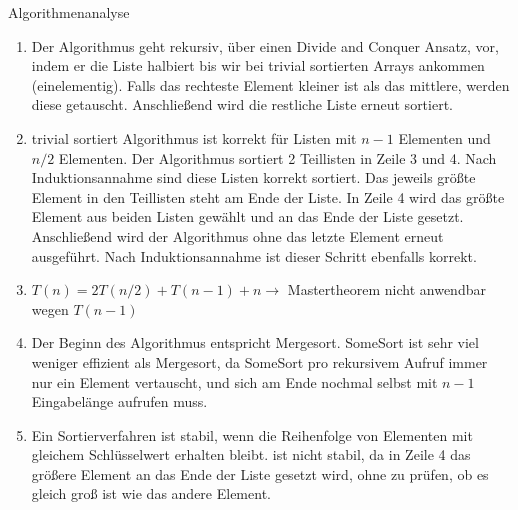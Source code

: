 \documentclass{article}
\begin{document}
\begin{exercise}{Algorithmenanalyse}
  \begin{solution}
    \begin{enumerate}
      \item Der Algorithmus geht rekursiv, über einen Divide and Conquer Ansatz, vor, indem er die Liste halbiert bis wir bei trivial sortierten Arrays ankommen (einelementig). Falls das rechteste Element kleiner ist als das mittlere, werden diese getauscht. Anschließend wird die restliche Liste erneut sortiert.
      \item \begin{induction}[|L|]
              \base[1] trivial sortiert
              \cond Algorithmus ist korrekt für Listen mit $n-1$ Elementen und $n/2$ Elementen.
              \step Der Algorithmus sortiert 2 Teillisten in Zeile 3 und 4. Nach Induktionsannahme sind diese Listen korrekt sortiert. Das jeweils größte Element in den Teillisten steht am Ende der Liste. In Zeile 4 wird das größte Element aus beiden Listen gewählt und an das Ende der Liste gesetzt. Anschließend wird der Algorithmus ohne das letzte Element erneut ausgeführt. Nach Induktionsannahme ist dieser Schritt ebenfalls korrekt.
            \end{induction}
      \item $T(n) = 2T(n/2) + T(n-1) + n \to$ Mastertheorem nicht anwendbar wegen $T(n-1)$
      \item Der Beginn des Algorithmus entspricht Mergesort. SomeSort ist sehr viel weniger effizient als Mergesort, da SomeSort pro rekursivem Aufruf immer nur ein Element vertauscht, und sich am Ende nochmal selbst mit $n-1$ Eingabelänge aufrufen muss.
      \item Ein Sortierverfahren ist stabil, wenn die Reihenfolge von Elementen mit gleichem Schlüsselwert erhalten bleibt.  ist nicht stabil, da in Zeile 4 das größere Element an das Ende der Liste gesetzt wird, ohne zu prüfen, ob es gleich groß ist wie das andere Element.
    \end{enumerate}
  \end{solution}
\end{exercise}
\end{document}
